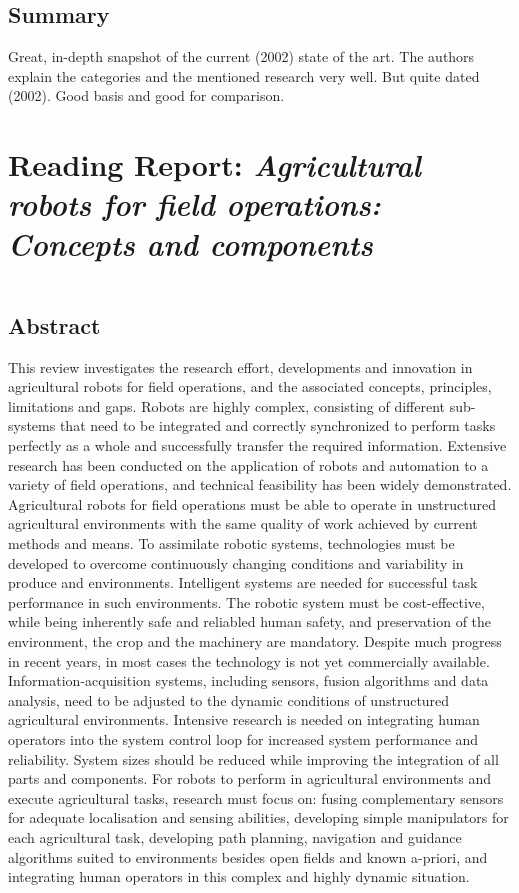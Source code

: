     \subsection*{Summary}
    Great, in-depth snapshot of the current (2002) state of the art. The authors explain the categories and the mentioned research very well.
    But quite dated (2002). Good basis and good for comparison.
    

    \newpage
    \section{Reading Report: \emph{Agricultural robots for field operations: Concepts and components}}\(\)
    \label{sec:Bechar2016}
    \cite{Bechar2016}
    
    \subsection*{Abstract}
    
    This review investigates the research effort, developments and innovation in agricultural
    robots for field operations, and the associated concepts, principles, limitations and gaps.
    Robots are highly complex, consisting of different sub-systems that need to be integrated
    and correctly synchronized to perform tasks perfectly as a whole and successfully transfer
    the required information. Extensive research has been conducted on the application of
    robots and automation to a variety of field operations, and technical feasibility has been
    widely demonstrated. Agricultural robots for field operations must be able to operate in
    unstructured agricultural environments with the same quality of work achieved by current methods and means. To assimilate robotic systems, technologies must be developed
    to overcome continuously changing conditions and variability in produce and environments. Intelligent systems are needed for successful task performance in such environments. The robotic system must be cost-effective, while being inherently safe and
    reliabled human safety, and preservation of the environment, the crop and the machinery
    are mandatory. Despite much progress in recent years, in most cases the technology is not
    yet commercially available. Information-acquisition systems, including sensors, fusion
    algorithms and data analysis, need to be adjusted to the dynamic conditions of unstructured agricultural environments. Intensive research is needed on integrating human
    operators into the system control loop for increased system performance and reliability.
    System sizes should be reduced while improving the integration of all parts and components. For robots to perform in agricultural environments and execute agricultural
    tasks, research must focus on: fusing complementary sensors for adequate localisation
    and sensing abilities, developing simple manipulators for each agricultural task, developing path planning, navigation and guidance algorithms suited to environments besides
    open fields and known a-priori, and integrating human operators in this complex and
    highly dynamic situation.
    
